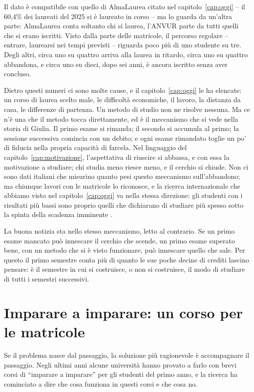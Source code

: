 Il dato è compatibile con quello di AlmaLaurea citato nel
capitolo~\ref{cap:oggi} -- il 60,4\% dei laureati del 2025 si è
laureato in corso \parencite{almalaurea2026} -- ma lo guarda da
un'altra parte: AlmaLaurea conta soltanto chi si laurea, l'ANVUR parte
da tutti quelli che si erano iscritti. Visto dalla parte delle
matricole, il percorso regolare -- entrare, laurearsi nei tempi
previsti -- riguarda poco più di uno studente su tre. Degli altri,
circa uno su quattro arriva alla laurea in ritardo, circa uno su
quattro abbandona, e circa uno su dieci, dopo sei anni, è ancora
iscritto senza aver concluso.

Dietro questi numeri ci sono molte cause, e il capitolo~\ref{cap:oggi}
le ha elencate: un corso di laurea scelto male, le difficoltà
economiche, il lavoro, la distanza da casa, le differenze di partenza.
Un metodo di studio non ne risolve nessuna. Ma ce n'è una che il
metodo tocca direttamente, ed è il meccanismo che si vede nella storia
di Giulia. Il primo esame si rimanda; il secondo si accumula al primo;
la sessione successiva comincia con un debito; e ogni esame rimandato
toglie un po' di fiducia nella propria capacità di farcela. Nel
linguaggio del capitolo~\ref{cap:motivazione}, l'aspettativa di
riuscire si abbassa, e con essa la motivazione a studiare; chi studia
meno riesce meno, e il cerchio si chiude. Non ci sono dati italiani
che misurino quanto pesi questo meccanismo sull'abbandono; ma chiunque
lavori con le matricole lo riconosce, e la ricerca internazionale che
abbiamo visto nel capitolo~\ref{cap:oggi} va nella stessa direzione:
gli studenti con i risultati più bassi sono proprio quelli che
dichiarano di studiare più spesso sotto la spinta della scadenza
imminente \parencite{hartwig2012}.

La buona notizia sta nello stesso meccanismo, letto al contrario. Se
un primo esame mancato può innescare il cerchio che scende, un primo
esame superato bene, con un metodo che si è visto funzionare, può
innescare quello che sale. Per questo il primo semestre conta più di
quanto le sue poche decine di crediti lascino pensare: è il semestre in
cui si costruisce, o non si costruisce, il modo di studiare di tutti i
semestri successivi.

\section{Imparare a imparare: un corso per le matricole}

Se il problema nasce dal passaggio, la soluzione più ragionevole è
accompagnare il passaggio. Negli ultimi anni alcune università hanno
provato a farlo con brevi corsi di \enquote{imparare a imparare} per
gli studenti del primo anno, e la ricerca ha cominciato a dire che cosa
funziona in questi corsi e che cosa no.

